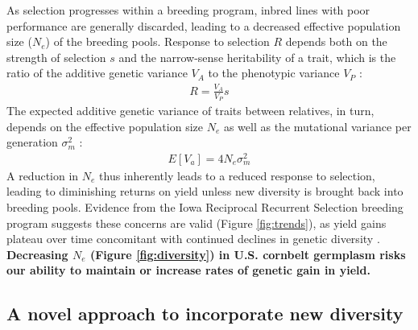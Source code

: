 \documentclass[draft,12pt]{article}
\begin{document}
As selection progresses within a breeding program, inbred lines with poor performance are generally discarded, leading to a decreased effective population size ($N_e$) of the breeding pools.
Response to selection $R$ depends both on the strength of selection $s$ and the narrow-sense heritability of a trait, which is the ratio of the additive genetic variance $V_A$ to the phenotypic variance $V_P$ \citep{kelly2011breeder}:
\begin{align*}
R=\frac{V_A}{V_P}s
\end{align*}
The expected additive genetic variance of traits between relatives, in turn, depends on the effective population size $N_e$ as well as the mutational variance per generation ${\sigma}_m^2$ \citep{whitlock1999neutral}:
\begin{align*}
E[V_a] = 4N_e {\sigma}_m^2
\end{align*}
A reduction in $N_e$ thus inherently leads to a reduced response to  selection, leading to diminishing returns on yield unless new diversity is brought back into breeding pools.
Evidence from the Iowa Reciprocal Recurrent Selection breeding program suggests these concerns are valid (Figure \ref{fig:trends}), as yield gains plateau over time \citep{rouse2003selection} concomitant with continued declines in genetic diversity \citep{Gerke:2013tw}.
\textbf{ Decreasing $N_e$ (Figure \ref{fig:diversity}) in U.S. cornbelt germplasm risks our ability to maintain or increase rates of genetic gain in yield.} 



\subsection*{A novel approach to incorporate new diversity}
\end{document}
